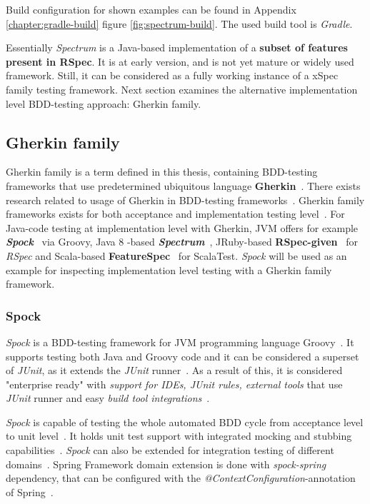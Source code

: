     Build configuration for shown examples can be found in Appendix \ref{chapter:gradle-build} figure \ref{fig:spectrum-build}.
    The used build tool is \textit{Gradle}.

    Essentially \textit{Spectrum} is a Java-based implementation of a \textbf{subset of features present in RSpec}. It is at early version,
    and is not yet mature or widely used framework. Still, it can be considered as a fully working instance of a xSpec family
    testing framework. Next section examines the alternative implementation level BDD-testing approach: Gherkin family.


    \subsection{Gherkin family}
    Gherkin family is a term defined in this thesis, containing BDD-testing frameworks that use predetermined ubiquitous
    language \textbf{Gherkin}~\cite{gherkin}. There exists research related to usage of Gherkin in BDD-testing frameworks~\cite{okolnychyi2016study}.
    Gherkin family frameworks exists for both acceptance and implementation testing level~\cite{okolnychyi2016study}. For Java-code testing at
    implementation level with Gherkin, JVM offers for example \textbf{\textit{Spock}}~\cite{spock} via Groovy, Java 8 -based \textbf{\textit{Spectrum}}~\cite{spectrum},
    JRuby-based \textbf{RSpec-given}~\cite{rspec-given} for \textit{RSpec} and Scala-based \textbf{FeatureSpec}~\cite{featurespec} for ScalaTest.
    \textit{Spock} will be used as an example for inspecting implementation level testing with a Gherkin family framework.

    \subsubsection{Spock}
    \textit{Spock} is a BDD-testing framework for JVM programming language Groovy~\cite{kapelonis2016java}. It supports
    testing both Java and Groovy code and it can be considered a superset of \textit{JUnit}, as it extends the \textit{JUnit} runner~\cite{spock}.
    As a result of this, it is considered "enterprise ready" with \textit{support for IDEs, \textit{JUnit} rules, external tools} that use
    \textit{JUnit} runner and easy \textit{build tool integrations}~\cite{kapelonis2016java}.

    \textit{Spock} is capable of testing the whole automated BDD cycle from acceptance level to unit level~\cite{kapelonis2016java}.
    It holds unit test support with integrated mocking and stubbing capabilities~\cite{spock}.
    \textit{Spock} can also be extended for integration testing of different domains~\cite{kapelonis2016java}.
    Spring Framework domain extension is done with \textit{spock-spring} dependency, that can be configured with
    the \textit{@ContextConfiguration}-annotation of Spring~\cite{springintegration}.

